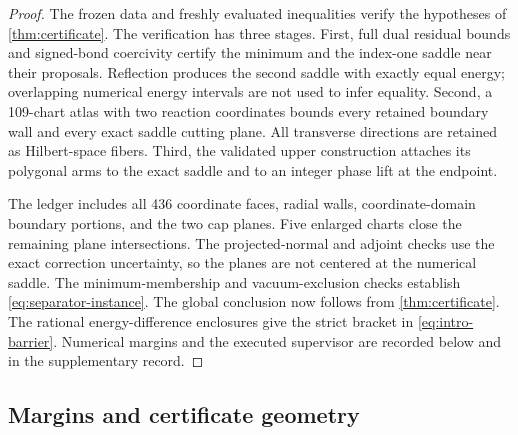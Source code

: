 \begin{proof}
The frozen data and freshly evaluated inequalities verify the hypotheses of \cref{thm:certificate}. The verification has three stages. First, full dual residual bounds and signed-bond coercivity certify the minimum and the index-one saddle near their proposals. Reflection produces the second saddle with exactly equal energy; overlapping numerical energy intervals are not used to infer equality. Second, a 109-chart atlas with two reaction coordinates bounds every retained boundary wall and every exact saddle cutting plane. All transverse directions are retained as Hilbert-space fibers. Third, the validated upper construction attaches its polygonal arms to the exact saddle and to an integer phase lift at the endpoint.

The ledger includes all 436 coordinate faces, radial walls, coordinate-domain boundary portions, and the two cap planes. Five enlarged charts close the remaining plane intersections. The projected-normal and adjoint checks use the exact correction uncertainty, so the planes are not centered at the numerical saddle. The minimum-membership and vacuum-exclusion checks establish \cref{eq:separator-instance}. The global conclusion now follows from \cref{thm:certificate}. The rational energy-difference enclosures give the strict bracket in \cref{eq:intro-barrier}. Numerical margins and the executed supervisor are recorded below and in the supplementary record.
\end{proof}

\subsection{Margins and certificate geometry}

